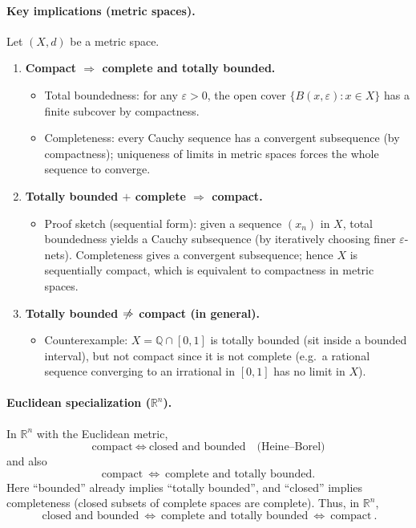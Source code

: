 \documentclass[12pt,a4paper]{article}
\begin{document}
\paragraph{Key implications (metric spaces).}
Let $(X,d)$ be a metric space.
\begin{enumerate}
	\item \textbf{Compact $\Rightarrow$ complete and totally bounded.}
	\begin{itemize}
		\item Total boundedness: for any $\varepsilon>0$, the open cover $\{B(x,\varepsilon):x\in X\}$ has a finite subcover by compactness.
		\item Completeness: every Cauchy sequence has a convergent subsequence (by compactness); uniqueness of limits in metric spaces forces the whole sequence to converge.
	\end{itemize}
	
	\item \textbf{Totally bounded $+$ complete $\Rightarrow$ compact.}
	\begin{itemize}
		\item Proof sketch (sequential form): given a sequence $(x_n)$ in $X$, total boundedness yields a Cauchy subsequence (by iteratively choosing finer $\varepsilon$-nets). Completeness gives a convergent subsequence; hence $X$ is sequentially compact, which is equivalent to compactness in metric spaces.
	\end{itemize}
	
	\item \textbf{Totally bounded $\centernot\Rightarrow$ compact (in general).}
	\begin{itemize}
		\item Counterexample: $X=\mathbb{Q}\cap[0,1]$ is totally bounded (sit inside a bounded interval), but not compact since it is not complete (e.g.\ a rational sequence converging to an irrational in $[0,1]$ has no limit in $X$).
	\end{itemize}
\end{enumerate}

\paragraph{Euclidean specialization ($\mathbb{R}^n$).}
In $\mathbb{R}^n$ with the Euclidean metric,
\[
\text{compact} \ \Longleftrightarrow\ \text{closed and bounded} \quad\text{(Heine--Borel)}
\]
and also
\[
\text{compact} \ \Longleftrightarrow\ \text{complete and totally bounded}.
\]
Here ``bounded'' already implies ``totally bounded'', and ``closed'' implies completeness (closed subsets of complete spaces are complete). Thus, in $\mathbb{R}^n$,
\[
\boxed{\ \text{closed and bounded} \ \Longleftrightarrow\ \text{complete and totally bounded} \ \Longleftrightarrow\ \text{compact}\ }.
\]
\end{document}

